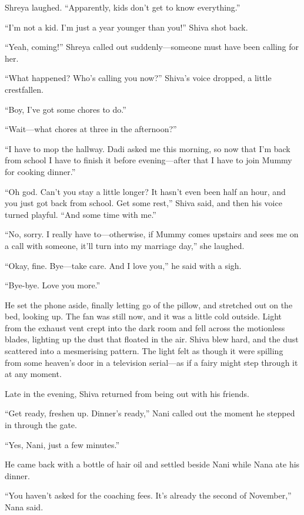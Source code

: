 Shreya laughed. ``Apparently, kids don't get to know everything.''

``I'm not a kid. I'm just a year younger than you!'' Shiva shot back.

``Yeah, coming!'' Shreya called out suddenly—someone must have been calling for her.

``What happened? Who's calling you now?'' Shiva's voice dropped, a little crestfallen.

``Boy, I've got some chores to do.''

``Wait—what chores at three in the afternoon?''

``I have to mop the hallway. Dadi asked me this morning, so now that I'm back from school I have to finish it before evening—after that I have to join Mummy for cooking dinner.''

``Oh god. Can't you stay a little longer? It hasn't even been half an hour, and you just got back from school. Get some rest,'' Shiva said, and then his voice turned playful. ``And some time with me.''

``No, sorry. I really have to—otherwise, if Mummy comes upstairs and sees me on a call with someone, it'll turn into my marriage day,'' she laughed.

``Okay, fine. Bye—take care. And I love you,'' he said with a sigh.

``Bye-bye. Love you more.''

He set the phone aside, finally letting go of the pillow, and stretched out on the bed, looking up. The fan was still now, and it was a little cold outside. Light from the exhaust vent crept into the dark room and fell across the motionless blades, lighting up the dust that floated in the air. Shiva blew hard, and the dust scattered into a mesmerising pattern. The light felt as though it were spilling from some heaven's door in a television serial—as if a fairy might step through it at any moment.

Late in the evening, Shiva returned from being out with his friends.

``Get ready, freshen up. Dinner's ready,'' Nani called out the moment he stepped in through the gate.

``Yes, Nani, just a few minutes.''

He came back with a bottle of hair oil and settled beside Nani while Nana ate his dinner.

``You haven't asked for the coaching fees. It's already the second of November,'' Nana said.


